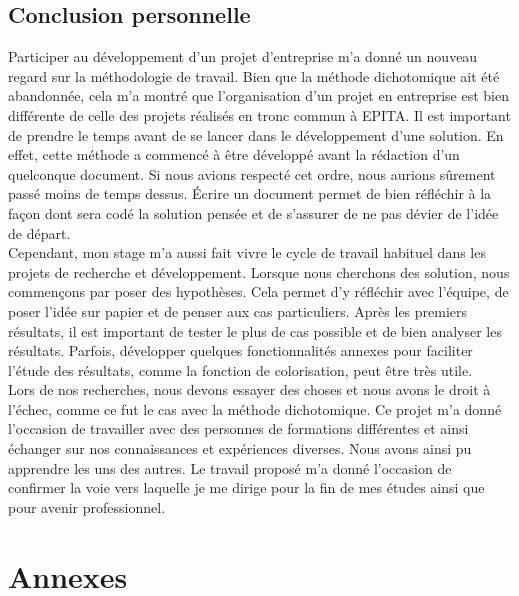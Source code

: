 \documentclass[12pt,a4paper]{article}
\begin{document}
\newpage
\subsection{Conclusion personnelle}
Participer au développement d'un projet d'entreprise m'a donné un nouveau regard sur la méthodologie de travail.\bigbreak
Bien que la méthode dichotomique ait été abandonnée, cela m'a montré que l'organisation d'un projet en entreprise est bien différente de celle des projets réalisés en tronc commun à EPITA. Il est important de prendre le temps avant de se lancer dans le développement d'une solution. En effet, cette méthode a commencé à être développé avant la rédaction d'un quelconque document. Si nous avions respecté cet ordre, nous aurions sûrement passé moins de temps dessus. Écrire un document permet de bien réfléchir à la façon dont sera codé la solution pensée et de s'assurer de ne pas dévier de l'idée de départ.\\
Cependant, mon stage m'a aussi fait vivre le cycle de travail habituel dans les projets de recherche et développement. Lorsque nous cherchons des solution, nous commençons par poser des hypothèses. Cela permet d'y réfléchir avec l'équipe, de poser l'idée sur papier et de penser aux cas particuliers. Après les premiers résultats, il est important de tester le plus de cas possible et de bien analyser les résultats. Parfois, développer quelques fonctionnalités annexes pour faciliter l'étude des résultats, comme la fonction de colorisation, peut être très utile.\\
Lors de nos recherches, nous devons essayer des choses et nous avons le droit à l'échec, comme ce fut le cas avec la méthode dichotomique.\bigbreak
Ce projet m'a donné l'occasion de travailler avec des personnes de formations différentes et ainsi échanger sur nos connaissances et expériences diverses. Nous avons ainsi pu apprendre les uns des autres.\bigbreak
Le travail proposé m’a donné l’occasion de confirmer la voie vers laquelle je me dirige pour la fin de mes études ainsi que pour avenir professionnel. 

\newpage
\pagestyle{empty}
\vspace*{\fill}
\titleformat{\section}[block]{\Large\bfseries\filcenter}{}{1em}{}
\section{Annexes}
\vspace*{\fill}
\end{document}

